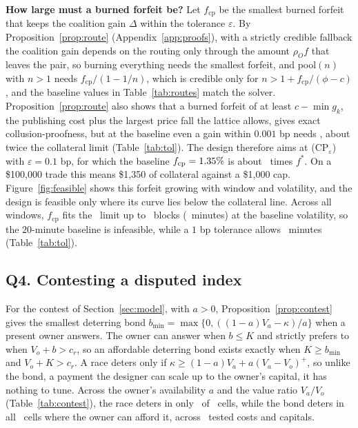 \documentclass[11pt]{article}
\begin{document}
\textbf{How large must a burned forfeit be?} Let $f_{\mathrm{cp}}$ be the smallest burned forfeit that keeps the coalition gain $\Delta$ within the tolerance $\varepsilon$. By Proposition~\ref{prop:route} (Appendix~\ref{app:proofs}), with a strictly credible fallback the coalition gain depends on the routing only through the amount $\rho_O f$ that leaves the pair, so burning everything needs the smallest forfeit, and pool$(n)$ with $n>1$ needs $f_{\mathrm{cp}}/(1-1/n)$, which is credible only for $n>1+f_{\mathrm{cp}}/(\phi-c)$, and the baseline values in Table~\ref{tab:routes} match the solver. Proposition~\ref{prop:route} also shows that a burned forfeit of at least $c-\min g_k$, the publishing cost plus the largest price fall the lattice allows, gives exact collusion-proofness, but at the baseline even a gain within $0.001$ bp needs \CpTolThousandth, about twice the collateral limit (Table~\ref{tab:tol}). The design therefore aims at (CP$_\varepsilon$) with $\varepsilon=0.1$ bp, for which the baseline $f_{\mathrm{cp}}=1.35\%$ is about \CpRatioHundred\ times $f^*$. On a \$100{,}000 trade this means \$1{,}350 of collateral against a \$1{,}000 cap. Figure~\ref{fig:feasible} shows this forfeit growing with window and volatility, and the design is feasible only where its curve lies below the collateral line. Across all windows, $f_{\mathrm{cp}}$ fits the \KappaAssumed\ limit up to \FrontierK\ blocks (\FrontierMin\ minutes) at the baseline volatility, so the $20$-minute baseline is infeasible, while a $1$ bp tolerance allows \FrontierTolOneMin\ minutes (Table~\ref{tab:tol}).

\subsection{Q4. Contesting a disputed index}
For the contest of Section~\ref{sec:model}, with $a>0$, Proposition~\ref{prop:contest} gives the smallest deterring bond $b_{\min}=\max\{0,((1-a)V_a-\kappa)/a\}$ when a present owner answers. The owner can answer when $b\le K$ and strictly prefers to when $V_o+b>c_r$, so an affordable deterring bond exists exactly when $K\ge b_{\min}$ and $V_o+K>c_r$. A race deters only if $\kappa\ge(1-a)V_a+a(V_a-V_o)^+$, so unlike the bond, a payment the designer can scale up to the owner's capital, it has nothing to tune. Across the owner's availability $a$ and the value ratio $V_a/V_o$ (Table~\ref{tab:contest}), the race deters in only \ContestRaceDeterCells\ of \ContestCells\ cells, while the bond deters in all \ContestBondDeters\ cells where the owner can afford it, across \RobSettings\ tested costs and capitals.
\end{document}
